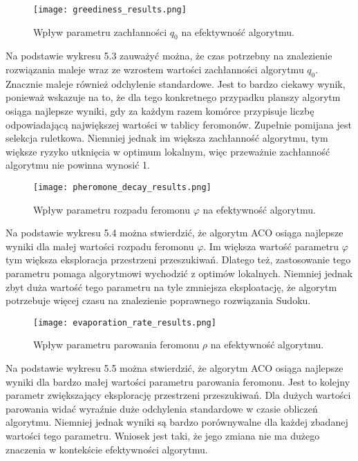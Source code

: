 \documentclass[11pt]{scrartcl} %
\begin{document}
\begin{figure}[h] %
        \centering
        \texttt{[image: greediness\_results.png]} %
        \caption{Wpływ parametru zachłanności $q_0$ na efektywność algorytmu.}
\end{figure}

Na podstawie wykresu 5.3 zauważyć można, że czas potrzebny na znalezienie rozwiązania maleje wraz ze wzrostem wartości zachłanności algorytmu $q_0$. Znacznie maleje również odchylenie standardowe. Jest to bardzo ciekawy wynik, ponieważ wskazuje na to, że dla tego konkretnego przypadku planszy algorytm osiąga najlepsze wyniki, gdy za każdym razem komórce przypisuje liczbę odpowiadającą największej wartości w tablicy feromonów. Zupełnie pomijana jest selekcja ruletkowa. Niemniej jednak im większa zachłanność algorytmu, tym większe ryzyko utknięcia w optimum lokalnym, więc przeważnie zachłanność algorytmu nie powinna wynosić 1.

\begin{figure}[h] %
        \centering
        \texttt{[image: pheromone\_decay\_results.png]} %
        \caption{Wpływ parametru rozpadu feromonu $\varphi$ na efektywność algorytmu.}
\end{figure}

Na podstawie wykresu 5.4 można stwierdzić, że algorytm ACO osiąga najlepsze wyniki dla małej wartości rozpadu feromonu $\varphi$. Im większa wartość parametru $\varphi$ tym większa eksploracja przestrzeni przeszukiwań. Dlatego też, zastosowanie tego parametru pomaga algorytmowi wychodzić z optimów lokalnych. Niemniej jednak zbyt duża wartość tego parametru na tyle zmniejsza eksploatację, że algorytm potrzebuje więcej czasu na znalezienie poprawnego rozwiązania Sudoku.\\

\begin{figure}[h] %
        \centering
        \texttt{[image: evaporation\_rate\_results.png]} %
        \caption{Wpływ parametru parowania feromonu $\rho$ na efektywność algorytmu.}
\end{figure}

Na podstawie wykresu 5.5 można stwierdzić, że algorytm ACO osiąga najlepsze wyniki dla bardzo małej wartości parametru parowania feromonu. Jest to kolejny parametr zwiększający eksplorację przestrzeni przeszukiwań. Dla dużych wartości parowania widać wyraźnie duże odchylenia standardowe w czasie obliczeń algorytmu. Niemniej jednak wyniki są bardzo porównywalne dla każdej zbadanej wartości tego parametru. Wniosek jest taki, że jego zmiana nie ma dużego znaczenia w kontekście efektywności algorytmu.
\end{document}
